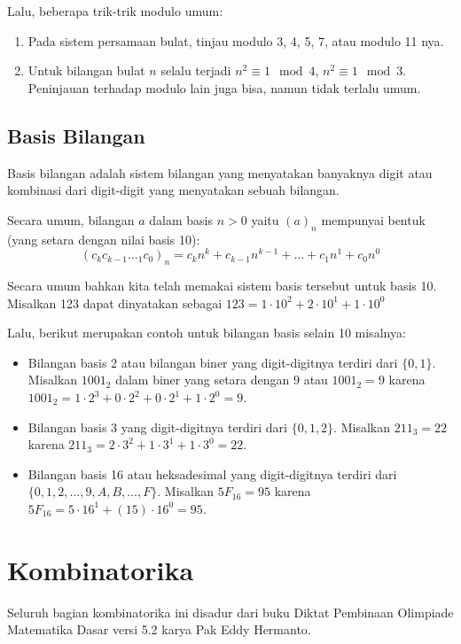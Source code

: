     Lalu, beberapa trik-trik modulo umum:
    \begin{enumerate}
        \item Pada sistem persamaan bulat, tinjau modulo 3, 4, 5, 7, atau modulo 11 nya.
        \item Untuk bilangan bulat $n$ selalu terjadi $n^2 \equiv 1 \mod 4$, $n^2 \equiv 1 \mod 3$. Peninjauan terhadap modulo lain juga bisa, namun tidak terlalu umum.
    \end{enumerate}
    
    \subsection{Basis Bilangan}
    Basis bilangan adalah sistem bilangan yang menyatakan banyaknya digit atau kombinasi dari digit-digit yang menyatakan sebuah bilangan.
    
    Secara umum, bilangan $a$ dalam basis $n > 0$ yaitu $(a)_n$ mempunyai bentuk (yang setara dengan nilai basis 10):
    $$(c_kc_{k-1}\dotsc_1c_0)_n = c_{k}n^k + c_{k-1}n^{k-1}+\dots+c_1n^{1}+c_0n^{0}$$
    
    Secara umum bahkan kita telah memakai sistem basis tersebut untuk basis 10. Misalkan 123 dapat dinyatakan sebagai $123 = 1\cdot 10^2 + 2\cdot 10^1 + 1\cdot 10^0$
    
    Lalu, berikut merupakan contoh untuk bilangan basis selain 10 misalnya: 
    \begin{itemize}
        \item Bilangan basis 2 atau bilangan biner yang digit-digitnya terdiri dari $\{0,1\}$. Misalkan $1001_2$ dalam biner yang setara dengan $9$ atau $1001_2 = 9$ karena $1001_2 = 1\cdot 2^3+0\cdot 2^2+0\cdot 2^1+1\cdot 2^0 = 9$. 
        \item Bilangan basis 3 yang digit-digitnya terdiri dari $\{0,1,2\}$. Misalkan $211_3 = 22$ karena $211_3 = 2\cdot 3^2+ 1\cdot 3^1+ 1\cdot 3^0 = 22$.
        \item Bilangan basis 16 atau heksadesimal yang digit-digitnya terdiri dari $\{0,1,2,\dots,9,A,B,\dots,F\}$. Misalkan $5F_{16} = 95$ karena $5F_{16} = 5 \cdot 16^1 + (15)\cdot 16^0 = 95$.
    \end{itemize}
   
    \section{Kombinatorika}
    Seluruh bagian kombinatorika ini disadur dari buku Diktat Pembinaan Olimpiade Matematika Dasar versi 5.2 karya Pak Eddy Hermanto.
    

